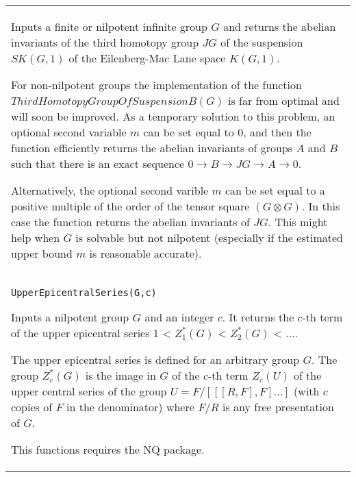 \documentclass[a4paper,11pt]{report}
\begin{document}
{\begin{center}
\begin{tabular}{|l|}
 Inputs a finite or nilpotent infinite group $G$ and returns the abelian invariants of the third homotopy group $JG$ of the suspension $SK(G,1)$ of the Eilenberg-Mac Lane space $K(G,1)$. 

 For non-nilpotent groups the implementation of the function $ThirdHomotopyGroupOfSuspensionB(G)$ is far from optimal and will soon be improved. As a temporary solution to this
problem, an optional second variable $m$ can be set equal to $0$, and then the function efficiently returns the abelian invariants of groups $A$ and $B$ such that there is an exact sequence $0 \longrightarrow B \longrightarrow JG \longrightarrow A \longrightarrow 0$. 

 Alternatively, the optional second varible $m$ can be set equal to a positive multiple of the order of the tensor square $(G \otimes G)$. In this case the function returns the abelian invariants of $JG$. This might help when $G$ is solvable but not nilpotent (especially if the estimated upper bound $m$ is reasonable accurate). \\
 \index{UpperEpicentralSeries} \texttt{UpperEpicentralSeries(G,c) } 

 Inputs a nilpotent group $G$ and an integer $c$. It returns the $c$-th term of the upper epicentral series $1$ {\textless} $ Z_1^\ast(G)$ {\textless} $Z_2^\ast(G)$ {\textless} $ \ldots $. 

 The upper epicentral series is defined for an arbitrary group $G$. The group $Z_c^\ast (G)$ is the image in $G$ of the $c$-th term $Z_c(U)$ of the upper central series of the group $U=F/[[[R,F],F] \ldots ]$ (with $c$ copies of $F$ in the denominator) where $F/R$ is any free presentation of $G$. 

 This functions requires the NQ package. \\
\end{tabular}\\[2mm]
\end{center}

 }

 
\end{document}
